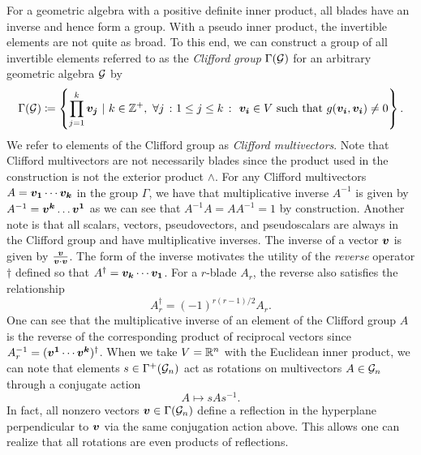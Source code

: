 For a geometric algebra with a positive definite inner product, all blades have an inverse and hence form a group. With a pseudo inner product, the invertible elements are not quite as broad. To this end, we can construct a group of all invertible elements referred to as the \emph{Clifford group} $\Gamma(\mathcal{G})$ for an arbitrary geometric algebra $\mathcal{G}$ by
\begin{equation}
\Gamma(\mathcal{G}) \coloneqq \left\{ \prod_{j=1}^k \boldsymbol{v_j} ~\vert~ k\in \mathbb{Z}^+,~ \forall j~\colon1\leq j \leq k~\colon~\boldsymbol{v_i} \in V ~\textrm{such that}~ g(\boldsymbol{v_i},\boldsymbol{v_i})\neq 0\right\}.
\end{equation}
We refer to elements of the Clifford group as \emph{Clifford multivectors}. Note that Clifford multivectors are not necessarily blades since the product used in the construction is not the exterior product $\wedge$. For any Clifford multivectors $A = \boldsymbol{v_1} \cdots \boldsymbol{v_k}$ in the group $\Gamma$, we have that multiplicative inverse $A^{-1}$ is given by $A^{-1} = \blade{v^k} \dots \blade{v^1}$ as we can see that $A^{-1}A=AA^{-1} = 1$ by construction.  Another note is that all scalars, vectors, pseudovectors, and pseudoscalars are always in the Clifford group and have multiplicative inverses. The inverse of a vector $\boldsymbol{v}$ is given by $\frac{\boldsymbol{v}}{\boldsymbol{v}\cdot\boldsymbol{v}}$. The form of the inverse motivates the utility of the \emph{reverse} operator $\dagger$ defined so that $A^\dagger = \boldsymbol{v_k} \cdots \boldsymbol{v_1}$. For a $r$-blade $A_r$, the reverse also satisfies the relationship
\begin{equation}
\label{eq:reverse_sign}
A_r^\dagger = (-1)^{r(r-1)/2} A_r.
\end{equation}
One can see that the multiplicative inverse of an element of the Clifford group $A$ is the reverse of the corresponding product of reciprocal vectors since $A_r^{-1} = (\boldsymbol{v^1} \cdots \boldsymbol{v^k})^\dagger$. When we take $V=\mathbb{R}^n$ with the Euclidean inner product, we can note that elements $s \in \Gamma^+(\mathcal{G}_n)$ act as rotations on multivectors $A\in \mathcal{G}_n$ through a conjugate action
\begin{equation}
A \mapsto s A s^{-1}.
\end{equation}
In fact, all nonzero vectors $\boldsymbol{v}\in\Gamma(\mathcal{G}_n)$ define a reflection in the hyperplane perpendicular to $\boldsymbol{v}$ via the same conjugation action above. This allows one can realize that all rotations are even products of reflections.

